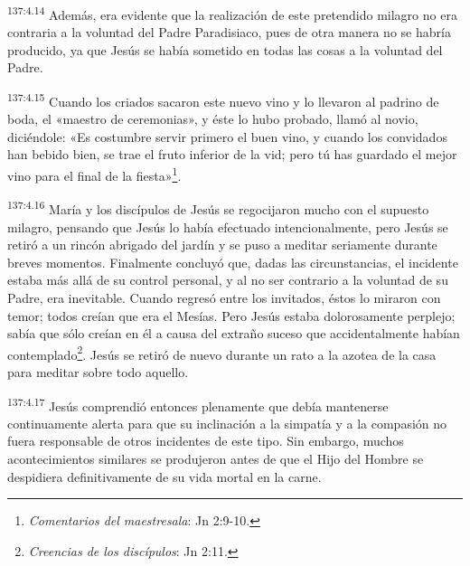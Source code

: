 \par
\textsuperscript{137:4.14} Además, era evidente que la realización de este pretendido milagro no era contraria a la voluntad del Padre Paradisiaco, pues de otra manera no se habría producido, ya que Jesús se había sometido en todas las cosas a la voluntad del Padre.

\par
\textsuperscript{137:4.15} Cuando los criados sacaron este nuevo vino y lo llevaron al padrino de boda, el «maestro de ceremonias», y éste lo hubo probado, llamó al novio, diciéndole: «Es costumbre servir primero el buen vino, y cuando los convidados han bebido bien, se trae el fruto inferior de la vid; pero tú has guardado el mejor vino para el final de la fiesta»\footnote{\textit{Comentarios del maestresala}: Jn 2:9-10.}.

\par
\textsuperscript{137:4.16} María y los discípulos de Jesús se regocijaron mucho con el supuesto milagro, pensando que Jesús lo había efectuado intencionalmente, pero Jesús se retiró a un rincón abrigado del jardín y se puso a meditar seriamente durante breves momentos. Finalmente concluyó que, dadas las circunstancias, el incidente estaba más allá de su control personal, y al no ser contrario a la voluntad de su Padre, era inevitable. Cuando regresó entre los invitados, éstos lo miraron con temor; todos creían que era el Mesías. Pero Jesús estaba dolorosamente perplejo; sabía que sólo creían en él a causa del extraño suceso que accidentalmente habían contemplado\footnote{\textit{Creencias de los discípulos}: Jn 2:11.}. Jesús se retiró de nuevo durante un rato a la azotea de la casa para meditar sobre todo aquello.

\par
\textsuperscript{137:4.17} Jesús comprendió entonces plenamente que debía mantenerse continuamente alerta para que su inclinación a la simpatía y a la compasión no fuera responsable de otros incidentes de este tipo. Sin embargo, muchos acontecimientos similares se produjeron antes de que el Hijo del Hombre se despidiera definitivamente de su vida mortal en la carne.

